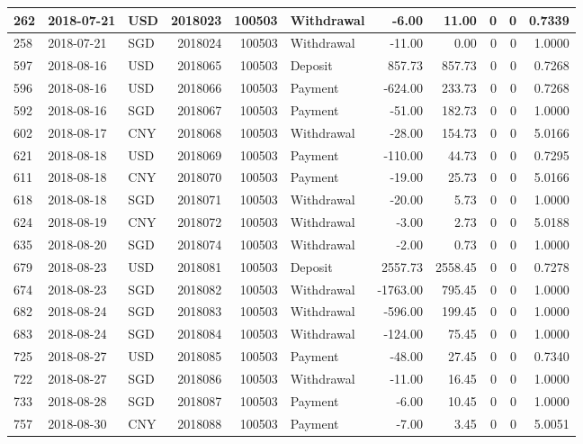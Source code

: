 \documentclass[]{article}
\begin{document}
\begin{table}[H]
\begin{tabular}{l|l|l|r|r|l|r|r|r|r|r}
\hline
262 & 2018-07-21 & USD & 2018023 & 100503 & Withdrawal & -6.00 & 11.00 & 0 & 0 & 0.7339\\
\hline
258 & 2018-07-21 & SGD & 2018024 & 100503 & Withdrawal & -11.00 & 0.00 & 0 & 0 & 1.0000\\
\hline
597 & 2018-08-16 & USD & 2018065 & 100503 & Deposit & 857.73 & 857.73 & 0 & 0 & 0.7268\\
\hline
596 & 2018-08-16 & USD & 2018066 & 100503 & Payment & -624.00 & 233.73 & 0 & 0 & 0.7268\\
\hline
592 & 2018-08-16 & SGD & 2018067 & 100503 & Payment & -51.00 & 182.73 & 0 & 0 & 1.0000\\
\hline
602 & 2018-08-17 & CNY & 2018068 & 100503 & Withdrawal & -28.00 & 154.73 & 0 & 0 & 5.0166\\
\hline
621 & 2018-08-18 & USD & 2018069 & 100503 & Payment & -110.00 & 44.73 & 0 & 0 & 0.7295\\
\hline
611 & 2018-08-18 & CNY & 2018070 & 100503 & Payment & -19.00 & 25.73 & 0 & 0 & 5.0166\\
\hline
618 & 2018-08-18 & SGD & 2018071 & 100503 & Withdrawal & -20.00 & 5.73 & 0 & 0 & 1.0000\\
\hline
624 & 2018-08-19 & CNY & 2018072 & 100503 & Withdrawal & -3.00 & 2.73 & 0 & 0 & 5.0188\\
\hline
635 & 2018-08-20 & SGD & 2018074 & 100503 & Withdrawal & -2.00 & 0.73 & 0 & 0 & 1.0000\\
\hline
679 & 2018-08-23 & USD & 2018081 & 100503 & Deposit & 2557.73 & 2558.45 & 0 & 0 & 0.7278\\
\hline
674 & 2018-08-23 & SGD & 2018082 & 100503 & Withdrawal & -1763.00 & 795.45 & 0 & 0 & 1.0000\\
\hline
682 & 2018-08-24 & SGD & 2018083 & 100503 & Withdrawal & -596.00 & 199.45 & 0 & 0 & 1.0000\\
\hline
683 & 2018-08-24 & SGD & 2018084 & 100503 & Withdrawal & -124.00 & 75.45 & 0 & 0 & 1.0000\\
\hline
725 & 2018-08-27 & USD & 2018085 & 100503 & Payment & -48.00 & 27.45 & 0 & 0 & 0.7340\\
\hline
722 & 2018-08-27 & SGD & 2018086 & 100503 & Withdrawal & -11.00 & 16.45 & 0 & 0 & 1.0000\\
\hline
733 & 2018-08-28 & SGD & 2018087 & 100503 & Payment & -6.00 & 10.45 & 0 & 0 & 1.0000\\
\hline
757 & 2018-08-30 & CNY & 2018088 & 100503 & Payment & -7.00 & 3.45 & 0 & 0 & 5.0051\\

\end{tabular}
\end{table}
\end{document}

